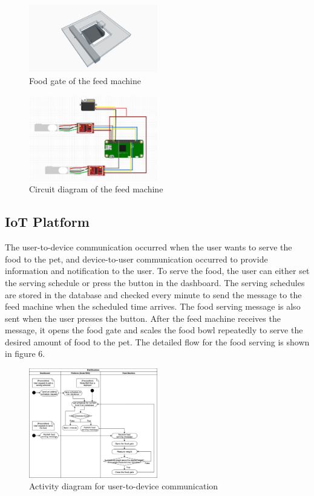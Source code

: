 ﻿\documentclass[conference]{IEEEtran}
\begin{document}
\begin{figure}[htbp]
\centerline{\includegraphics[width=0.5\textwidth]{./images/servo_gate.png}}
\caption{Food gate of the feed machine}
\label{fig}
\end{figure}

\begin{figure}[htbp]
\centerline{\includegraphics[width=0.5\textwidth]{./images/feed machine circuit.jpg}}
\caption{Circuit diagram of the feed machine}
\label{fig}
\end{figure}

\subsection{IoT Platform}
The user-to-device communication occurred when the user wants to serve the food to the pet, and device-to-user communication occurred to provide information and notification to the user.
To serve the food, the user can either set the serving schedule or press the button in the dashboard.
The serving schedules are stored in the database and checked every minute to send the message to the feed machine when the scheduled time arrives.
The food serving message is also sent when the user presses the button.
After the feed machine receives the message, it opens the food gate and scales the food bowl repeatedly to serve the desired amount of food to the pet.
The detailed flow for the food serving is shown in figure 6.

\begin{figure}[htbp]
\centerline{\includegraphics[width=0.5\textwidth]{./images/user2device.png}}
\caption{Activity diagram for user-to-device communication}
\label{fig}
\end{figure}
\end{document}
